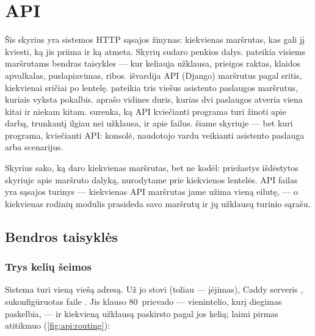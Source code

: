 \chapter{API}\label{ch:api}

\providecommand{\apiroute}[2]{\multicolumn{2}{@{}l@{}}{\route{#1}{#2}}\\*}

Šis skyrius yra sistemos HTTP sąsajos žinynas: kiekvienas maršrutas, kas gali jį kviesti, ką jis
priima ir ką atmeta. Skyrių sudaro penkios dalys.  pateikia visiems
maršrutams bendras taisykles --- kur keliauja užklausa, prieigos raktas, klaidos apvalkalas,
puslapiavimas, ribos.  išvardija API (Django) maršrutus pagal sritis, kiekvienai
sričiai po lentelę.  pateikia tris viešus asistento paslaugos maršrutus,
kuriais vyksta pokalbis.  aprašo vidines duris, kurias dvi paslaugos atveria
viena kitai ir niekam kitam.  surenka, ką API kviečianti programa turi žinoti
apie darbą, trunkantį ilgiau nei užklausa, ir apie failus.  šiame skyriuje --- bet
kuri programa, kviečianti API: konsolė, naudotojo vardu veikianti asistento paslauga arba scenarijus.

Skyrius sako, ką daro kiekvienas maršrutas, bet ne kodėl: priežastys išdėstytos skyriuje apie
maršruto dalyką, nurodytame prie kiekvienos lentelės. API failas  yra sąsajos turinys
--- kiekvienas API maršrutas jame užima vieną eilutę, --- o kiekvienas rodinių modulis prasideda
savo maršrutų ir jų užklausų turinio sąrašu.


\section{Bendros taisyklės}\label{sec:api:conventions}

\subsection{Trys kelių šeimos}\label{sec:api:families}

Sistema turi vieną viešą adresą. Už jo stovi  (toliau ---
įėjimas), Caddy serveris , sukonfigūruotas faile .
Jis klauso 80~prievado --- vienintelio, kurį diegimas paskelbia, --- ir kiekvieną užklausą
paskirsto pagal jos kelią; laimi pirmas atitikmuo (\cref{fig:api:routing}):

